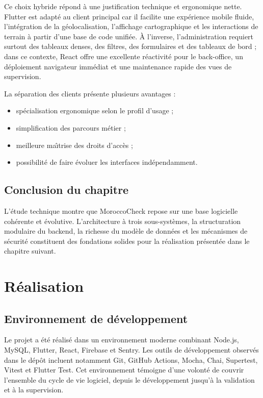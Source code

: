 ﻿\documentclass[12pt,a4paper]{report}
\begin{document}
Ce choix hybride r\'epond \`a une justification technique et ergonomique nette. Flutter est adapt\'e au client principal car il facilite une exp\'erience mobile fluide, l'int\'egration de la g\'eolocalisation, l'affichage cartographique et les interactions de terrain \`a partir d'une base de code unifi\'ee. \`A l'inverse, l'administration requiert surtout des tableaux denses, des filtres, des formulaires et des tableaux de bord ; dans ce contexte, React offre une excellente r\'eactivit\'e pour le back-office, un d\'eploiement navigateur imm\'ediat et une maintenance rapide des vues de supervision.

La s\'eparation des clients pr\'esente plusieurs avantages :
\begin{itemize}
  \item sp\'ecialisation ergonomique selon le profil d'usage ;
  \item simplification des parcours m\'etier ;
  \item meilleure ma\^\i trise des droits d'acc\`es ;
  \item possibilit\'e de faire \'evoluer les interfaces ind\'ependamment.
\end{itemize}

\section{Conclusion du chapitre}
L'\'etude technique montre que MoroccoCheck repose sur une base logicielle coh\'erente et \'evolutive. L'architecture \`a trois sous-syst\`emes, la structuration modulaire du backend, la richesse du mod\`ele de donn\'ees et les m\'ecanismes de s\'ecurit\'e constituent des fondations solides pour la r\'ealisation pr\'esent\'ee dans le chapitre suivant.

\chapter{R\'ealisation}

\section{Environnement de d\'eveloppement}
Le projet a \'et\'e r\'ealis\'e dans un environnement moderne combinant Node.js, MySQL, Flutter, React, Firebase et Sentry. Les outils de d\'eveloppement observ\'es dans le d\'ep\^ot incluent notamment Git, GitHub Actions, Mocha, Chai, Supertest, Vitest et Flutter Test. Cet environnement t\'emoigne d'une volont\'e de couvrir l'ensemble du cycle de vie logiciel, depuis le d\'eveloppement jusqu'\`a la validation et \`a la supervision.
\end{document}
